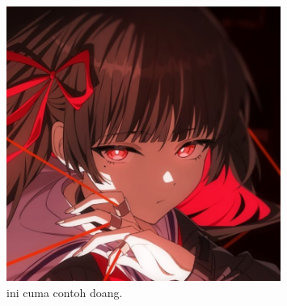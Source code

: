 	\begin{figure}[h!]
		\centering %
		\includegraphics[width=0.8\textwidth]{assets/gambar-1.jpg}
		\caption{ini cuma contoh doang.}
		\label{fig:contoh-f} %
	\end{figure}
